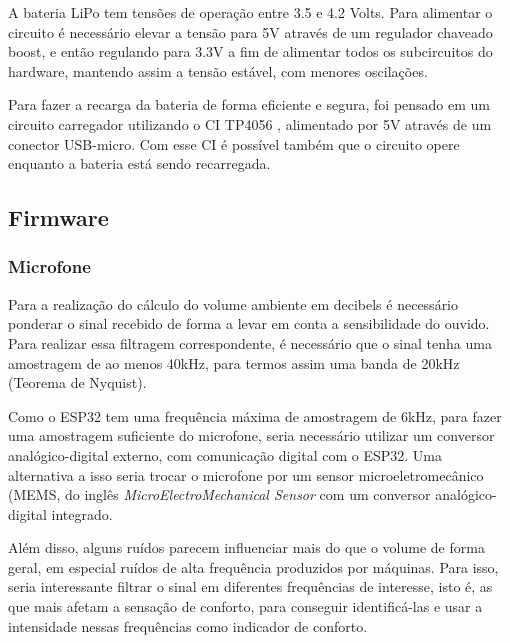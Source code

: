 \documentclass[../monografia.tex]{subfiles}
\begin{document}
A bateria LiPo tem tensões de operação entre 3.5 e 4.2 Volts. Para alimentar o circuito é necessário elevar a tensão para 5V através de um regulador chaveado boost, e então regulando para 3.3V a fim de alimentar todos os subcircuitos do hardware, mantendo assim a tensão estável, com menores oscilações. 

Para fazer a recarga da bateria de forma eficiente e segura, foi pensado em um circuito carregador utilizando o CI TP4056 \cite{tp4056}, alimentado por 5V através de um conector USB-micro. Com esse CI é possível também que o circuito opere enquanto a bateria está sendo recarregada. 

\subsection{Firmware}
\subsubsection{Microfone}

Para a realização do cálculo do volume ambiente em decibels é necessário ponderar o sinal recebido de forma a levar em conta a sensibilidade do ouvido. Para realizar essa filtragem correspondente, é necessário que o sinal tenha uma amostragem de ao menos 40kHz, para termos assim uma banda de 20kHz (Teorema de Nyquist). 

Como o ESP32 tem uma frequência máxima de amostragem de 6kHz, para fazer uma amostragem suficiente do microfone, seria necessário utilizar um conversor analógico-digital externo, com comunicação digital com o ESP32. Uma alternativa a isso seria trocar o microfone por um sensor microeletromecânico (MEMS, do inglês \textit{MicroElectroMechanical Sensor} com um conversor analógico-digital integrado. 

Além disso, alguns ruídos parecem influenciar mais do que o volume de forma geral, em especial ruídos de alta frequência produzidos por máquinas. Para isso, seria interessante filtrar o sinal em diferentes frequências de interesse, isto é, as que mais afetam a sensação de conforto, para conseguir identificá-las e usar a intensidade nessas frequências como indicador de conforto. 
\end{document}
